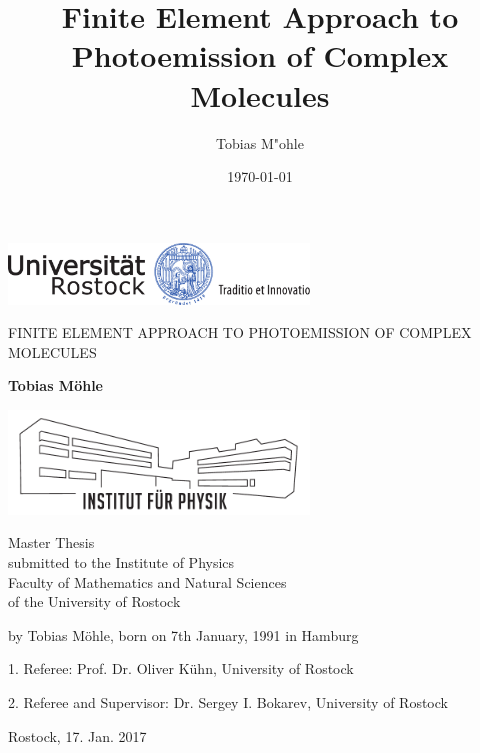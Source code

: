 \documentclass[12pt,a4paper,oneside]{book}
\author{Tobias M"ohle}
\date{\today }
\title{Finite Element Approach to Photoemission of Complex Molecules}
\begin{document}
\indent
\pagestyle{plain}
\parindent6mm
\setlength{\parskip}{0mm}
\renewcommand{\vec}{\bm}
\newcommand{\mat}[1]{\mathbb{#1}}
\newcommand{\prog}[1]{\texttt{#1}}
\newcommand{\eq}[1]{eq.(\ref{#1})}
\newcommand{\eqs}[1]{eqs.(\ref{#1})}
\begin{titlepage}
   \begin{center} 
   \vspace{30mm}
   \includegraphics[width=0.6\textwidth]{UNI-Logo_Siegel_4c_RZ}
   \vspace{10mm}

   {\Huge
   \uppercase{ Finite Element Approach to Photoemission of Complex Molecules}}

   \vspace{25mm}
   \textbf{Tobias M\"ohle}
   
   \vfill

   \includegraphics[width=0.6\textwidth]{institutslogo_neu}
   \vspace{5mm}

   Master Thesis\\
   submitted to the Institute of Physics \\
   Faculty of Mathematics and Natural Sciences \\
   of the University of Rostock 
   
   \vspace{15mm}
   
   \end{center}

   by Tobias M\"ohle, born on 7th January, 1991 in Hamburg\\
   
   \vspace{15mm}
   
   1. Referee: Prof. Dr. Oliver K\"uhn, University of Rostock

   2. Referee and Supervisor: Dr. Sergey I. Bokarev, University of Rostock

   \vspace{7mm}
   Rostock, 17. Jan. 2017
   \vspace{7mm}
\end{titlepage}
\frontmatter

\newpage
\tableofcontents
\mainmatter
\end{document}
